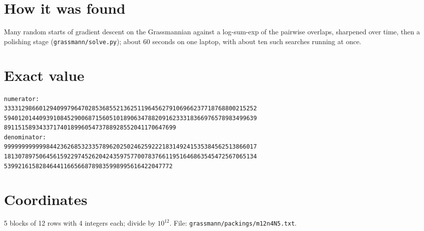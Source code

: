 \documentclass[11pt,a4paper]{article}
\begin{document}
\section{How it was found}
Many random starts of gradient descent on the Grassmannian against a log-sum-exp of the pairwise overlaps, sharpened over time, then a polishing stage (\texttt{grassmann/solve.py}); about 60 seconds on one laptop, with about ten such searches running at once.


\appendix
\section{Exact value}
{\small
\begin{verbatim}
numerator:
333312986601294099796470285368552136251196456279106966237718768800215252
594012014409391084529006871560510189063478820916233318366976578983499639
8911515893433717401899605473788928552041170647699
denominator:
999999999999844236268532335789620250246259222183149241535384562513866017
181307897506456159229745262042435975770078376611951646863545472567065134
539921615828464411665668789835998995616422047772
\end{verbatim}}

\section{Coordinates}
5 blocks of 12 rows with 4 integers each; divide by $10^{12}$. File: \texttt{grassmann/packings/m12n4N5.txt}.
{\tiny
\begin{multicols}{3}
\end{multicols}}
\end{document}
